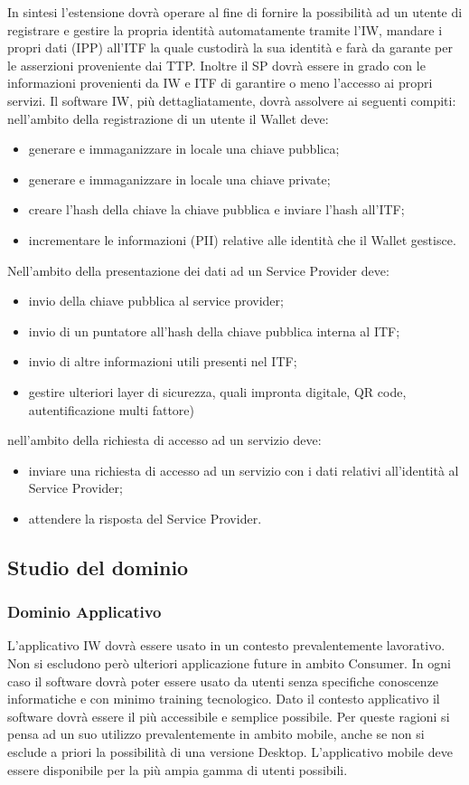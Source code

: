 In sintesi l’estensione dovrà operare al fine di fornire la possibilità ad un utente di registrare e gestire la propria identità automatamente tramite l’IW, mandare i propri dati (IPP) all’ITF la quale custodirà la sua identità e farà da garante per le asserzioni proveniente dai TTP. Inoltre il SP dovrà essere in grado con le informazioni provenienti da IW e ITF di garantire o meno l’accesso ai propri servizi.
Il software IW, più dettagliatamente, dovrà assolvere ai seguenti compiti:
nell’ambito della registrazione di un utente il Wallet deve:
\begin{itemize}
    \item generare e immaganizzare in locale una chiave pubblica;
    \item generare e immaganizzare in locale una chiave private;
    \item creare l’hash della chiave la chiave pubblica e inviare l’hash all’ITF;
    \item incrementare le informazioni (PII) relative alle identità che il Wallet gestisce.
\end{itemize}
Nell’ambito della presentazione dei dati ad un Service Provider deve:
\begin{itemize}
    \item invio della chiave pubblica al service provider;
    \item invio di un puntatore all’hash della chiave pubblica interna al ITF;
    \item invio di altre informazioni utili presenti nel ITF;
    \item gestire ulteriori layer di sicurezza, quali impronta digitale, QR code, autentificazione multi fattore)
\end{itemize}
nell’ambito della richiesta di accesso ad un servizio deve:
\begin{itemize}
    \item inviare una richiesta di accesso ad un servizio con i dati relativi all’identità al Service Provider;
    \item attendere la risposta del Service Provider.
\end{itemize}

\subsection{Studio del dominio}
\subsubsection{Dominio Applicativo}
L’applicativo IW dovrà essere usato in un contesto prevalentemente lavorativo. Non si escludono però ulteriori applicazione future in ambito Consumer. In ogni caso il software dovrà poter essere usato da utenti senza specifiche conoscenze informatiche e con minimo training tecnologico. Dato il contesto applicativo il software dovrà essere il più accessibile e semplice possibile. Per queste ragioni si pensa ad un suo utilizzo prevalentemente in ambito mobile, anche se non si esclude a priori la possibilità di una versione Desktop. L’applicativo mobile deve essere disponibile per la più ampia gamma di utenti possibili.
